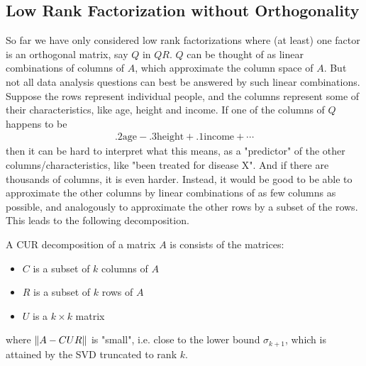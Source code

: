 \documentclass[11pt]{article}
\numberwithin{equation}{section}
\begin{document}
\subsection{Low Rank Factorization without Orthogonality}
So far we have only considered low rank factorizations where (at least) one factor is an orthogonal matrix, say $Q$ in $QR$. 
$Q$ can be thought of as linear combinations of columns of $A$, which approximate the column space of $A$. 
But not all data analysis questions can best be answered by such linear combinations. Suppose the rows represent individual people, 
and the columns represent some of their characteristics, like age, height and income. If one of the columns of $Q$ happens to be \begin{align*}
    .2\mathrm{age} - .3\mathrm{height} + .1\mathrm{income} + \cdots
\end{align*}
then it can be hard to interpret what this means, as a "predictor" of the other columns/characteristics, like "been treated for disease X". 
And if there are thousands of columns, it is even harder. Instead, it would be good to be able to approximate the other columns by linear combinations of as few columns as possible,
and analogously to approximate the other rows by a subset of the rows. This leads to the following decomposition.

\begin{definition}
    A CUR decomposition of a matrix $A$ is consists of the matrices:\begin{itemize}
        \item $C$ is a subset of $k$ columns of $A$
        \item $R$ is a subset of $k$ rows of $A$
        \item $U$ is a $k \times k$ matrix
    \end{itemize}
    where $\left\| A - CUR \right\|$ is "small", i.e. close to the lower bound $\sigma_{k+1}$, which is attained by the SVD truncated to rank $k$.
\end{definition}
\end{document}
